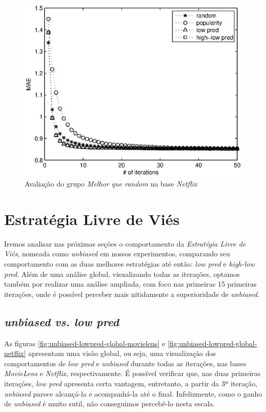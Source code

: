\begin{figure}[ht]
\centering
\includegraphics{nf_low_highlow.eps}
\caption{Avaliação do grupo \textit{Melhor que random} na base \textit{Netflix}}
\label{fig:better-random-netflix}
\end{figure}

\section{Estratégia Livre de Viés}

Iremos analisar nas próximas seções o comportamento da \textit{Estratégia Livre de Viés}, nomeada como \textit{unbiased} em nossos experimentos, comparando seu comportamento com as duas melhores estratégias até então: \textit{low pred} e \textit{high-low pred}. Além de uma análise global, visualizando todas as iterações, optamos também por realizar uma análise ampliada, com foco nas primeiras 15 primeiras iterações, onde é possível perceber mais nitidamente a superioridade de \textit{unbiased}.

\subsection{\textit{unbiased vs. low pred}}

As figuras \ref{fig:unbiased-lowpred-global-movielens} e \ref{fig:unbiased-lowpred-global-netflix} apresentam uma visão global, ou seja, uma visualização dos comportamentos de \textit{low pred} e \textit{unbiased} durante todas as iterações, nas bases \textit{MovieLens} e \textit{Netflix}, respectivamente. É possível verificar que, nas duas primeiras iterações, \textit{low pred} apresenta certa vantagem, entretanto, a partir da 3ª iteração, \textit{unbiased} parece alcançá-la e acompanhá-la até o final. Infelizmente, como o ganho de \textit{unbiased} é muito sutil, não conseguimos percebê-lo nesta escala.

